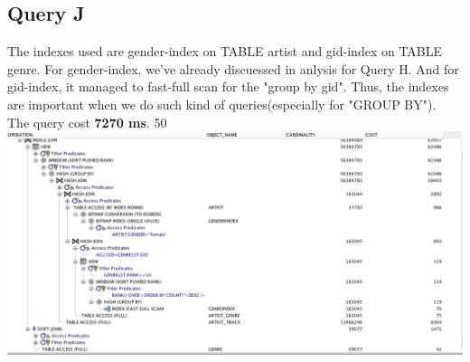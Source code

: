 \documentclass[11pt]{article} %
\begin{document}
{\subsection{Query J}
The indexes used are gender-index on TABLE artist and gid-index on TABLE genre. For gender-index, we've already discuessed in anlysis for Query H. And for gid-index, it managed to fast-full scan for the "group by gid". Thus, the indexes are important when we do such kind of queries(especially for "GROUP BY").\\
The query cost \textbf{7270 ms}. 50%
\\
\includegraphics[width=14cm]{costj}


}
\end{document}
